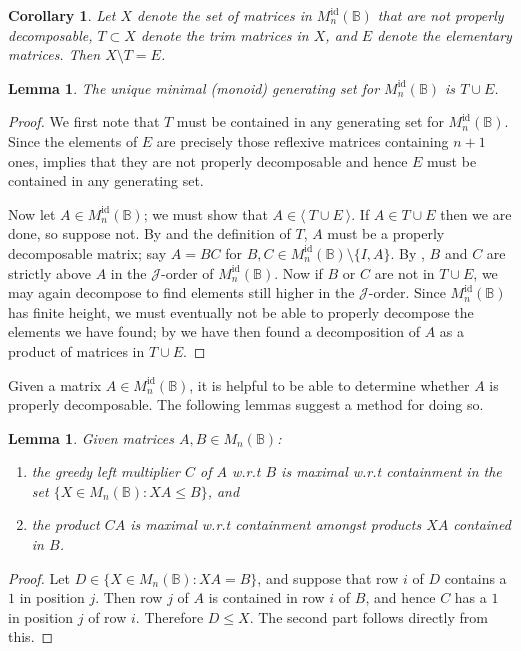 \documentclass[11pt]{article}
\newtheorem{cor}[thm]{Corollary}
\newtheorem{lemma}[thm]{Lemma}
\numberwithin{equation}{section}
\newcommand{\set}[2]{\ensuremath{\{#1 : #2 \}}}
\newcommand{\genset}[1]{\ensuremath{\langle\: #1 \:\rangle}}
\newcommand{\B}{\mathbb{B}}
\newcommand{\Bn}{M_n(\B)}
\newcommand{\Refn}{M_n^{\text{id}}(\B)}
\newcommand{\J}{\mathscr{J}}
\begin{document}
\begin{cor}
  Let $X$ denote the set of matrices in $\Refn$ that are not properly
  decomposable, $T \subset X$ denote the trim matrices in $X$, and $E$ denote
  the elementary matrices. Then $X \setminus T = E$. 
\end{cor}

\begin{lemma}
  The unique minimal (monoid) generating set for $\Refn$ is $T \cup E$.
\end{lemma}
\begin{proof}
  We first note that $T$ must be contained in any generating set for $\Refn$.
  Since the elements of $E$ are precisely those reflexive matrices containing
  $n + 1$ ones,  implies that they are not
  properly decomposable and hence $E$ must be contained in any generating set.

  Now let $A \in \Refn$; we must show that $A \in \genset{T \cup E}$. If $A \in
  T \cup E$ then we are done, so suppose not. By
   and the definition of $T$, $A$ must be a
  properly decomposable matrix; say $A = BC$ for $B, C \in \Refn\setminus\{I,
  A\}$. By , $B$ and $C$ are strictly above $A$ in
  the $\J$-order of $\Refn$. Now if $B$ or $C$ are not in $T \cup E$, we may
  again decompose to find elements still higher in the $\J$-order. Since $\Refn$
  has finite height, we must eventually not be able to properly decompose the
  elements we have found; by  we have then
  found a decomposition of $A$ as a product of matrices in $T \cup E$.
\end{proof}

Given a matrix $A \in \Refn$, it is helpful to be able to determine whether $A$
is properly decomposable. The following lemmas suggest a method for doing so.

\begin{lemma}
  Given matrices $A, B \in \Bn$:
  \begin{enumerate}
    \item
      the greedy left multiplier $C$ of $A$ w.r.t $B$ is maximal w.r.t
      containment in the set $\set{X \in \Bn}{XA \leq B}$, and\\
    \item 
      the product $CA$ is maximal w.r.t containment amongst products $XA$
      contained in $B$.
  \end{enumerate}
\end{lemma}
\begin{proof}
  Let $D \in \set{X \in \Bn}{XA = B}$, and suppose that row $i$ of $D$ contains
  a $1$ in position $j$. Then row $j$ of $A$ is contained in row $i$ of $B$, and
  hence $C$ has a $1$ in position $j$ of row $i$. Therefore $D \leq X$. The
  second part follows directly from this.
\end{proof}
\end{document}
